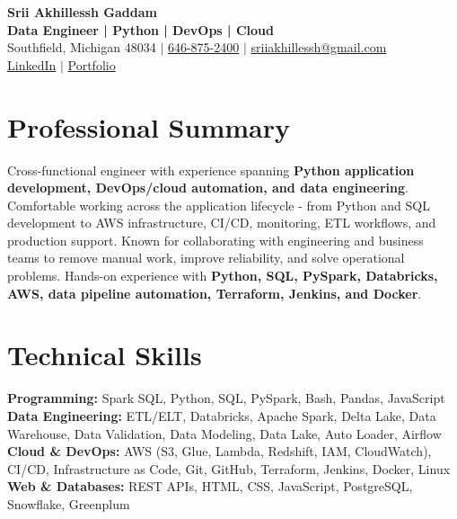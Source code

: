 \documentclass[letterpaper,10pt]{article}
\begin{document}
\fontsize{9.35pt}{10.45pt}\selectfont

\begin{center}
    {\LARGE \textbf{Srii Akhillessh Gaddam}} \\[-1pt]
    \textbf{Data Engineer | Python | DevOps | Cloud} \\[2pt]
    Southfield, Michigan 48034 $|$
    \href{tel:6468752400}{646-875-2400} $|$
    \href{mailto:sriiakhillessh@gmail.com}{sriiakhillessh@gmail.com} \\[1pt]
    \href{https://www.linkedin.com/in/srii-akhiilessh-gaddam-b48668191/}{LinkedIn} $|$
    \href{https://sriiakhillesshg.github.io/portfolio/}{Portfolio}
\end{center}
\vspace{-8pt}

\section{Professional Summary}
\small{Cross-functional engineer with experience spanning \textbf{Python application development, DevOps/cloud automation, and data engineering}. Comfortable working across the application lifecycle - from Python and SQL development to AWS infrastructure, CI/CD, monitoring, ETL workflows, and production support. Known for collaborating with engineering and business teams to remove manual work, improve reliability, and solve operational problems. Hands-on experience with \textbf{Python, SQL, PySpark, Databricks, AWS, data pipeline automation, Terraform, Jenkins, and Docker}.}

\section{Technical Skills}
\small{
\textbf{Programming:} Spark SQL, Python, SQL, PySpark, Bash, Pandas, JavaScript \\
\textbf{Data Engineering:} ETL/ELT, Databricks, Apache Spark, Delta Lake, Data Warehouse, Data Validation, Data Modeling, Data Lake, Auto Loader, Airflow \\
\textbf{Cloud \& DevOps:} AWS (S3, Glue, Lambda, Redshift, IAM, CloudWatch), CI/CD, Infrastructure as Code, Git, GitHub, Terraform, Jenkins, Docker, Linux \\
\textbf{Web \& Databases:} REST APIs, HTML, CSS, JavaScript, PostgreSQL, Snowflake, Greenplum
}
\end{document}
